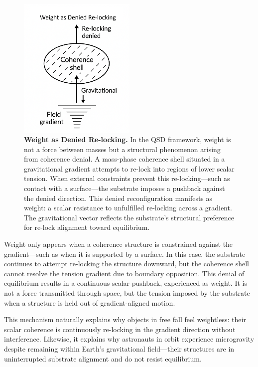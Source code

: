 \documentclass[entropy,article,submit,pdftex,moreauthors]{Definitions/mdpi}
\begin{document}
\begin{figure}[H]
    \centering
    \includegraphics[width=0.5\textwidth]{figures/weight.png}
    \caption{
    \textbf{Weight as Denied Re-locking.}
    In the QSD framework, weight is not a force between masses but a structural phenomenon arising from coherence denial. A mass-phase coherence shell situated in a gravitational gradient attempts to re-lock into regions of lower scalar tension. When external constraints prevent this re-locking—such as contact with a surface—the substrate imposes a pushback against the denied direction. This denied reconfiguration manifests as weight: a scalar resistance to unfulfilled re-locking across a gradient. The gravitational vector reflects the substrate’s structural preference for re-lock alignment toward equilibrium.
    }
    \label{fig:weight-denied-relock}
\end{figure}


Weight only appears when a coherence structure is constrained against the gradient---such as when it is supported by a surface. In this case, the substrate continues to attempt re-locking the structure downward, but the coherence shell cannot resolve the tension gradient due to boundary opposition. This denial of equilibrium results in a continuous scalar pushback, experienced as weight. It is not a force transmitted through space, but the tension imposed by the substrate when a structure is held out of gradient-aligned motion.

This mechanism naturally explains why objects in free fall feel weightless: their scalar coherence is continuously re-locking in the gradient direction without interference. Likewise, it explains why astronauts in orbit experience microgravity despite remaining within Earth's gravitational field---their structures are in uninterrupted substrate alignment and do not resist equilibrium.
\end{document}
